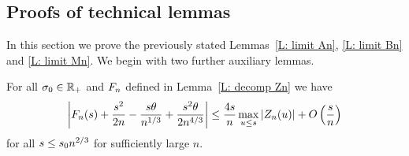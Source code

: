 \subsection{Proofs of technical lemmas} \label{S: lemma proofs}

In this section we prove the previously stated Lemmas~\ref{L: limit An}, \ref{L: limit Bn} and \ref{L: limit Mn}.
We begin with two further auxiliary lemmas.

\begin{lemma} \label{L: asymptotic An}
	For all $\sigma_0 \in \mathbb{R}_+$ and $F_n$ defined in Lemma~\ref{L: decomp Zn} we have
	\begin{equation}
		\left| F_n(s) + \frac{s^2}{2n} - \frac{s\theta}{n^{1 / 3}}  + \frac{s^2\theta}{2n^{4 / 3}}  \right|
		\leq \frac{4s}{n} \max_{u \leq s} |Z_n(u)| + O\left(\frac{s}{n}\right)
	\end{equation}
	for all $s \leq s_0n^{2 / 3}$ for sufficiently large $n$.
\end{lemma}

